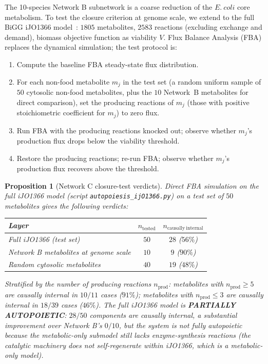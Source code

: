 \documentclass[11pt,a4paper]{article}
\theoremstyle{plain}
\newtheorem{proposition}[theorem]{Proposition}
\theoremstyle{definition}
\theoremstyle{remark}
\begin{document}
The 10-species Network B subnetwork is a coarse reduction of the $E.~coli$
core metabolism. To test the closure criterion at genome scale, we extend
to the full BiGG iJO1366 model~\cite{orth2011}: $1805$ metabolites, $2583$
reactions (excluding exchange and demand), biomass objective function as
viability $V$. Flux Balance Analysis (FBA) replaces the dynamical
simulation; the test protocol is:
\begin{enumerate}[leftmargin=*,itemsep=2pt]
\item Compute the baseline FBA steady-state flux distribution.
\item For each non-food metabolite $m_j$ in the test set (a random
  uniform sample of $50$ cytosolic non-food metabolites, plus the $10$
  Network~B metabolites for direct comparison), set the producing
  reactions of $m_j$ (those with positive stoichiometric coefficient
  for $m_j$) to zero flux.
\item Run FBA with the producing reactions knocked out; observe
  whether $m_j$'s production flux drops below the viability threshold.
\item Restore the producing reactions; re-run FBA; observe whether
  $m_j$'s production flux recovers above the threshold.
\end{enumerate}

\begin{proposition}[Network C closure-test verdicts]
\label{prop:netC-verdict}
Direct FBA simulation on the full iJO1366 model
(script \texttt{autopoiesis\_ijO1366.py}) on a test set of $50$
metabolites gives the following verdicts:
\begin{center}\small
\begin{tabular}{lcc}
\toprule
Layer & $n_{\mathrm{tested}}$ & $n_{\mathrm{causally~internal}}$ \\
\midrule
Full iJO1366 (test set) & $50$ & $28$ ($56\%$) \\
Network B metabolites at genome scale & $10$ & $9$ ($90\%$) \\
Random cytosolic metabolites & $40$ & $19$ ($48\%$) \\
\bottomrule
\end{tabular}
\end{center}
Stratified by the number of producing reactions $n_{\mathrm{prod}}$:
metabolites with $n_{\mathrm{prod}} \geq 5$ are causally internal in
$10/11$ cases ($91\%$); metabolites with $n_{\mathrm{prod}} \leq 3$ are
causally internal in $18/39$ cases ($46\%$). The full iJO1366 model is
\textbf{PARTIALLY AUTOPOIETIC}: $28/50$ components are causally internal,
a substantial improvement over Network B's $0/10$, but the system is
not fully autopoietic because the metabolic-only submodel still lacks
enzyme-synthesis reactions (the catalytic machinery does not
self-regenerate within iJO1366, which is a metabolic-only model).
\end{proposition}
\end{document}
